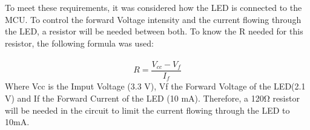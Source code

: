 To meet these requirements, it was considered how the LED is connected to the MCU. To control the forward Voltage intensity and the current flowing through the LED, a resistor will be needed between both. To know the R needed for this resistor, the following formula was used:\\\\
\begin{equation}
R = \frac{V_{cc} - V_{f}}{I_{f}}
\end{equation}
Where Vcc is the Imput Voltage (3.3 V), Vf the Forward Voltage of the LED(2.1 V) and If the Forward Current of the LED (10 mA). Therefore, a 120\si{\ohm} resistor will be needed in the circuit to limit the current flowing through the LED to 10mA.  \\\\
